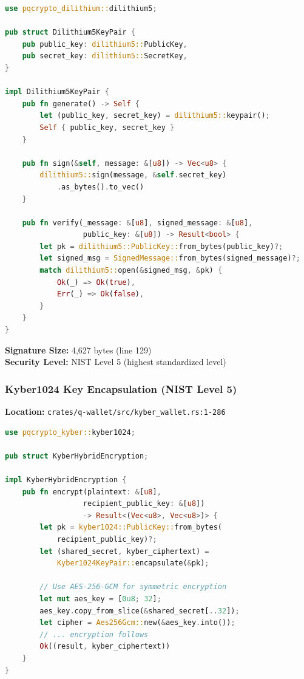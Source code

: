 \documentclass[11pt,a4paper]{article}
\begin{document}
\begin{lstlisting}[language=Rust,caption={Dilithium5 Implementation}]
use pqcrypto_dilithium::dilithium5;

pub struct Dilithium5KeyPair {
    pub public_key: dilithium5::PublicKey,
    pub secret_key: dilithium5::SecretKey,
}

impl Dilithium5KeyPair {
    pub fn generate() -> Self {
        let (public_key, secret_key) = dilithium5::keypair();
        Self { public_key, secret_key }
    }

    pub fn sign(&self, message: &[u8]) -> Vec<u8> {
        dilithium5::sign(message, &self.secret_key)
            .as_bytes().to_vec()
    }

    pub fn verify(_message: &[u8], signed_message: &[u8],
                  public_key: &[u8]) -> Result<bool> {
        let pk = dilithium5::PublicKey::from_bytes(public_key)?;
        let signed_msg = SignedMessage::from_bytes(signed_message)?;
        match dilithium5::open(&signed_msg, &pk) {
            Ok(_) => Ok(true),
            Err(_) => Ok(false),
        }
    }
}
\end{lstlisting}

\textbf{Signature Size:} 4,627 bytes (line 129)\\
\textbf{Security Level:} NIST Level 5 (highest standardized level)

\subsubsection{Kyber1024 Key Encapsulation (NIST Level 5)}

\textbf{Location:} \texttt{crates/q-wallet/src/kyber\_wallet.rs:1-286}

\begin{lstlisting}[language=Rust,caption={Kyber1024 Hybrid Encryption}]
use pqcrypto_kyber::kyber1024;

pub struct KyberHybridEncryption;

impl KyberHybridEncryption {
    pub fn encrypt(plaintext: &[u8],
                  recipient_public_key: &[u8])
                  -> Result<(Vec<u8>, Vec<u8>)> {
        let pk = kyber1024::PublicKey::from_bytes(
            recipient_public_key)?;
        let (shared_secret, kyber_ciphertext) =
            Kyber1024KeyPair::encapsulate(&pk);

        // Use AES-256-GCM for symmetric encryption
        let mut aes_key = [0u8; 32];
        aes_key.copy_from_slice(&shared_secret[..32]);
        let cipher = Aes256Gcm::new(&aes_key.into());
        // ... encryption follows
        Ok((result, kyber_ciphertext))
    }
}
\end{lstlisting}
\end{document}

